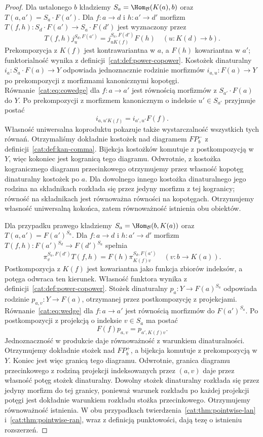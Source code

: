 \begin{proof}
Dla ustalonego $b$ kładziemy $S_a=\Hom_{\mathcal B}(K(a),b)$ oraz $T(a,a')=S_a\cdot F(a')$. Dla $f:a\to d$ i $h:a'\to d'$ morfizm $T(f,h):S_d\cdot F(a')\to S_a\cdot F(d')$ jest wyznaczony przez
\[
 T(f,h)j_u^{S_d,F(a')}=j_{uK(f)}^{S_a,F(d')}F(h)
 \quad(u:K(d)\to b).
\]
Prekompozycja z $K(f)$ jest kontrawariantna w $a$, a $F(h)$ kowariantna w $a'$; funktorialność wynika z definicji~\ref{cat:def:power-copower}. Kostożek dinaturalny $i_a:S_a\cdot F(a)\to Y$ odpowiada jednoznacznie rodzinie morfizmów $i_{a,u}:F(a)\to Y$ po prekompozycji z morfizmami kanonicznymi kopotęgi. Równanie~\eqref{cat:eq:cowedge} dla $f:a\to a'$ jest równością morfizmów z $S_{a'}\cdot F(a)$ do $Y$. Po prekompozycji z morfizmem kanonicznym o indeksie $u'\in S_{a'}$ przyjmuje postać
\[
 i_{a,u'K(f)}=i_{a',u'}F(f).
\]
Własność uniwersalna koproduktu pokazuje także wystarczalność wszystkich tych równań. Otrzymaliśmy dokładnie kostożek nad diagramem $FP_b^-$ z definicji~\ref{cat:def:kan-comma}. Bijekcja kostożków komutuje z postkompozycją w $Y$, więc kokoniec jest kogranicą tego diagramu. Odwrotnie, z kostożka kogranicznego diagramu przecinkowego otrzymujemy przez własność kopotęg dinaturalny kostożek po $a$. Dla dowolnego innego kostożka dinaturalnego jego rodzina na składnikach rozkłada się przez jedyny morfizm z tej kogranicy; równość na składnikach jest równoważna równości na kopotęgach. Otrzymujemy własność uniwersalną kokońca, zatem równoważność istnienia obu obiektów.

Dla przypadku prawego kładziemy $S_a=\Hom_{\mathcal B}(b,K(a))$ oraz $T(a,a')=F(a')^{S_a}$. Dla $f:a\to d$ i $h:a'\to d'$ morfizm $T(f,h):F(a')^{S_d}\to F(d')^{S_a}$ spełnia
\[
 \pi_v^{S_a,F(d')}T(f,h)=F(h)\pi_{K(f)v}^{S_d,F(a')}
 \quad(v:b\to K(a)).
\]
Postkompozycja z $K(f)$ jest kowariantna jako funkcja zbiorów indeksów, a potęga odwraca ten kierunek. Własność funktora wynika z definicji~\ref{cat:def:power-copower}. Stożek dinaturalny $p_a:Y\to F(a)^{S_a}$ odpowiada rodzinie $p_{a,v}:Y\to F(a)$, otrzymanej przez postkompozycję z projekcjami. Równanie~\eqref{cat:eq:wedge} dla $f:a\to a'$ jest równością morfizmów do $F(a')^{S_a}$. Po postkompozycji z projekcją o indeksie $v\in S_a$ ma postać
\[
 F(f)p_{a,v}=p_{a',K(f)v}.
\]
Jednoznaczność w produkcie daje równoważność z warunkiem dinaturalności. Otrzymujemy dokładnie stożek nad $FP_b^+$, a bijekcja komutuje z prekompozycją w $Y$. Koniec jest więc granicą tego diagramu. Odwrotnie, granica diagramu przecinkowego z rodziną projekcji indeksowanych przez $(a,v)$ daje przez własność potęg stożek dinaturalny. Dowolny stożek dinaturalny rozkłada się przez jedyny morfizm do tej granicy, ponieważ warunek rozkładu po każdej projekcji potęgi jest dokładnie warunkiem rozkładu stożka przecinkowego. Otrzymujemy równoważność istnienia. W obu przypadkach twierdzenia~\ref{cat:thm:pointwise-lan} i~\ref{cat:thm:pointwise-ran}, wraz z definicją punktowości, dają tezę o istnieniu rozszerzeń.


\end{proof}
